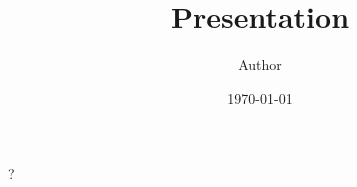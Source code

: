 \documentclass[bigger,xetex,serif,aspectratio=169]{beamer}
\title{Presentation}
\author{Author}
\date{\today}
\begin{document}
\maketitle

\begin{frame}
  \begin{center}
    {\Huge?}
  \end{center}
\end{frame}
\end{document}
